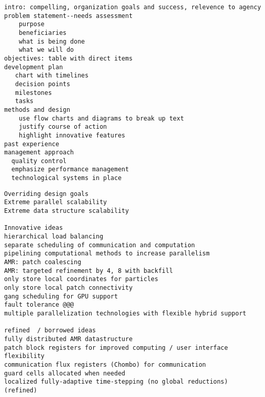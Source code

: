 \documentclass[14pt,letter]{article}
\begin{document}
% 
% 
\begin{verbatim}
intro: compelling, organization goals and success, relevence to agency
problem statement--needs assessment
    purpose
    beneficiaries
    what is being done
    what we will do
objectives: table with direct items
development plan
   chart with timelines
   decision points
   milestones
   tasks
methods and design
    use flow charts and diagrams to break up text
    justify course of action
    highlight innovative features
past experience
management approach
  quality control
  emphasize performance management
  technological systems in place
\end{verbatim}

\begin{verbatim}
Overriding design goals
Extreme parallel scalability
Extreme data structure scalability

Innovative ideas
hierarchical load balancing
separate scheduling of communication and computation
pipelining computational methods to increase parallelism
AMR: patch coalescing
AMR: targeted refinement by 4, 8 with backfill
only store local coordinates for particles
only store local patch connectivity
gang scheduling for GPU support
fault tolerance @@@
multiple parallelization technologies with flexible hybrid support

refined  / borrowed ideas
fully distributed AMR datastructure
patch block registers for improved computing / user interface flexibility
communication flux registers (Chombo) for communication
guard cells allocated when needed
localized fully-adaptive time-stepping (no global reductions) (refined)
\end{verbatim}
\end{document}
